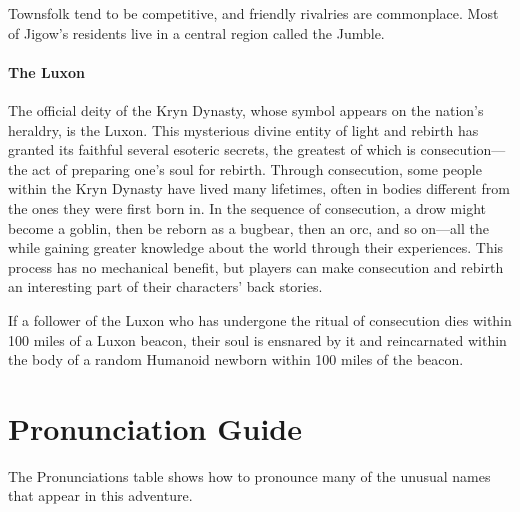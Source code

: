 \documentclass[10pt,a4paper,twoside,twocolumn,openany,nodeprecatedcode]{dndbook}
\begin{document}
Townsfolk tend to be competitive, and friendly rivalries are commonplace. Most of Jigow's residents live in a central region called the Jumble.

\paragraph{The Luxon}
The official deity of the Kryn Dynasty, whose symbol appears on the nation's heraldry, is the Luxon. This mysterious divine entity of light and rebirth has granted its faithful several esoteric secrets, the greatest of which is consecution—the act of preparing one's soul for rebirth. Through consecution, some people within the Kryn Dynasty have lived many lifetimes, often in bodies different from the ones they were first born in. In the sequence of consecution, a drow might become a goblin, then be reborn as a bugbear, then an orc, and so on—all the while gaining greater knowledge about the world through their experiences. This process has no mechanical benefit, but players can make consecution and rebirth an interesting part of their characters' back stories.

If a follower of the Luxon who has undergone the ritual of consecution dies within 100 miles of a Luxon beacon, their soul is ensnared by it and reincarnated within the body of a random Humanoid newborn within 100 miles of the beacon.

\section{Pronunciation Guide}
The Pronunciations table shows how to pronounce many of the unusual names that appear in this adventure.
\end{document}
